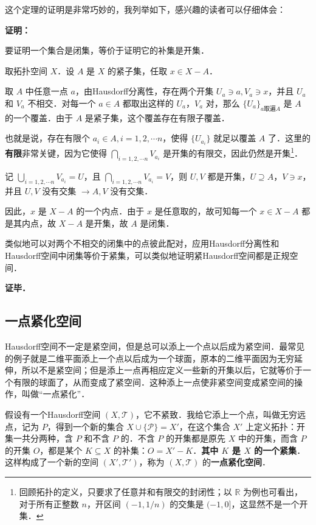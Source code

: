 这个定理的证明是非常巧妙的，我列举如下，感兴趣的读者可以仔细体会：

\textbf{证明：}

要证明一个集合是闭集，等价于证明它的补集是开集．

取拓扑空间 $X$．设 $A$ 是 $X$ 的紧子集，任取 $x\in X-A$．

取 $A$ 中任意一点 $a$，由Hausdorff分离性，存在两个开集 $U_a\ni a, V_a\ni x$，并且 $U_a$ 和 $V_a$ 不相交．对每一个 $a\in A$ 都取出这样的 $U_a$，$V_a$ 对，那么 $\{U_a\}_{a\text{取遍}A}$ 是 $A$ 的一个覆盖．由于 $A$ 是紧子集，这个覆盖存在有限子覆盖．

也就是说，存在有限个 $a_i\in A, i=1, 2, \cdots n$，使得 $\{U_{a_i}\}$ 就足以覆盖 $A$ 了．这里的\textbf{有限}非常关键，因为它使得 $\bigcap\limits_{i=1,2, \cdots n}V_{a_i}$ 是开集的有限交，因此仍然是开集\footnote{回顾拓扑的定义，只要求了任意并和有限交的封闭性；以 $\mathbb{R}$ 为例也可看出，对于所有正整数 $n$，开区间 $(-1,1/n)$ 的交集是 $(-1, 0]$，这显然不是一个开集．}．

记 $\bigcup\limits_{i=1,2, \cdots n}V_{a_i}=U$，且 $\bigcap\limits_{i=1,2, \cdots n}V_{a_i}=V$，则 $U, V$ 都是开集，$U\supseteq A$，$V\ni x$，并且 $U, V$ 没有交集 $\rightarrow A, V$ 没有交集．

因此，$x$ 是 $X-A$ 的一个内点．由于 $x$ 是任意取的，故可知每一个 $x\in X-A$ 都是其内点，故 $X-A$ 是开集，故 $A$ 是闭集．

类似地可以对两个不相交的闭集中的点彼此配对，应用Hausdorff分离性和Hausdorff空间中闭集等价于紧集，可以类似地证明紧Hausdorff空间都是正规空间．


\textbf{证毕．}

\subsection{一点紧化空间}

Hausdorff空间不一定是紧空间，但是总可以添上一个点以后成为紧空间．最常见的例子就是二维平面添上一个点以后成为一个球面，原本的二维平面因为无穷延伸，所以不是紧空间；但是添上一点再相应定义一些新的开集以后，它就等价于一个有限的球面了，从而变成了紧空间．这种添上一点使非紧空间变成紧空间的操作，叫做“一点紧化”．

假设有一个Hausdorff空间 $(X, \mathcal{T})$，它不紧致．我给它添上一个点，叫做无穷远点，记为 $P$，得到一个新的集合 $X\cup \{\mathcal{P}\}=X'$，在这个集合 $X'$ 上定义拓扑：开集一共分两种，含 $P$ 和不含 $P$ 的．不含 $P$ 的开集都是原先 $X$ 中的开集，而含 $P$ 的开集 $O$，都是某个 $K\subseteq X$ 的补集：$O=X'-K$．\textbf{其中 $K$ 是 $X$ 的一个紧集}．这样构成了一个新的空间 $(X', \mathcal{T}')$，称为 $(X, \mathcal{T})$ 的\textbf{一点紧化空间}．

